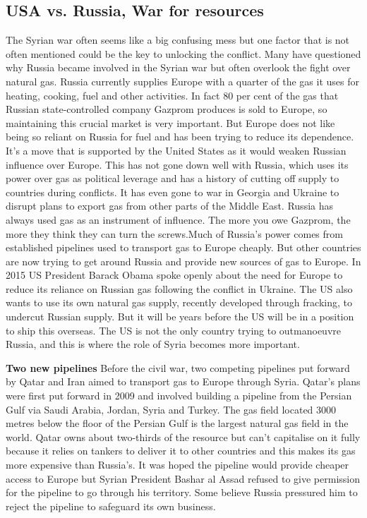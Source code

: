 \subsection{USA vs. Russia, War for resources}
The Syrian war often seems like a big confusing mess but one factor that is not often mentioned could be the key to unlocking the conflict.
Many have questioned why Russia became involved in the Syrian war but often overlook the fight over natural gas.
Russia currently supplies Europe with a quarter of the gas it uses for heating, cooking, fuel and other activities.
In fact 80 per cent of the gas that Russian state-controlled company Gazprom produces is sold to Europe, so maintaining this crucial market is very important.
But Europe does not like being so reliant on Russia for fuel and has been trying to reduce its dependence. It’s a move that is supported by the United States as it would weaken Russian influence over Europe.
This has not gone down well with Russia, which uses its power over gas as political leverage and has a history of cutting off supply to countries during conflicts. It has even gone to war in Georgia and Ukraine to disrupt plans to export gas from other parts of the Middle East.
Russia has always used gas as an instrument of influence. The more you owe Gazprom, the more they think they can turn the screws.Much of Russia’s power comes from established pipelines used to transport gas to Europe cheaply. But other countries are now trying to get around Russia and provide new sources of gas to Europe.
In 2015 US President Barack Obama spoke openly about the need for Europe to reduce its reliance on Russian gas following the conflict in Ukraine.
The US also wants to use its own natural gas supply, recently developed through fracking, to undercut Russian supply. But it will be years before the US will be in a position to ship this overseas.
The US is not the only country trying to outmanoeuvre Russia, and this is where the role of Syria becomes more important.

\textbf{Two new pipelines} \newline
Before the civil war, two competing pipelines put forward by Qatar and Iran aimed to transport gas to Europe through Syria.
Qatar’s plans were first put forward in 2009 and involved building a pipeline from the Persian Gulf via Saudi Arabia, Jordan, Syria and Turkey.
The gas field located 3000 metres below the floor of the Persian Gulf is the largest natural gas field in the world. Qatar owns about two-thirds of the resource but can’t capitalise on it fully because it relies on tankers to deliver it to other countries and this makes its gas more expensive than Russia’s.
It was hoped the pipeline would provide cheaper access to Europe but Syrian President Bashar al Assad refused to give permission for the pipeline to go through his territory. Some believe Russia pressured him to reject the pipeline to safeguard its own business.


